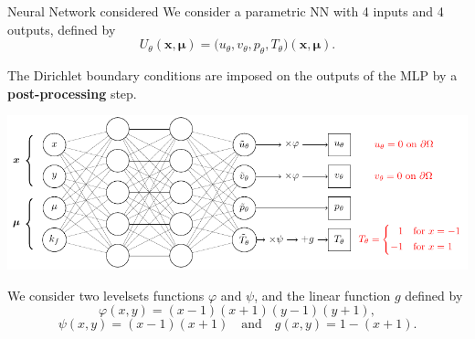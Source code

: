 \begin{frame}{Neural Network considered}
    \vspace{-2pt}
    We consider a parametric NN with 4 inputs and 4 outputs, defined by
    $$U_\theta(\bm{x},\bm{\mu}) = \big(u_\theta,v_\theta,p_\theta,T_\theta)(\bm{x},\bm{\mu}).$$
    
    The Dirichlet boundary conditions are imposed on the outputs of the MLP by a \textbf{post-processing} step. \citep{Sukumar_2022}
    
    \begin{center}
        \includegraphics[width=0.74\linewidth]{images/pinn/network/network.pdf}
    \end{center}
    We consider two levelsets functions $\varphi$ and $\psi$, and the linear function $g$ defined by
    \begin{equation*}
        \varphi(x,y) = (x-1)(x+1)(y-1)(y+1),
    \end{equation*}
    \begin{equation*}
        \psi(x,y) = (x-1)(x+1) \quad \text{and} \quad g(x,y) = 1 - (x+1).
    \end{equation*}
\end{frame}

